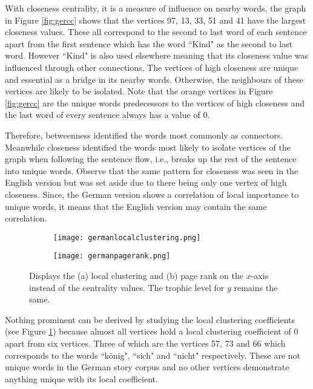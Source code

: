 With closeness centrality, it is a measure of influence on nearby words, the graph in Figure \ref{fig:gercc} shows that the vertices 97, 13, 33, 51 and 41 have the largest closeness values. These all correspond to the second to last word of each sentence apart from the first sentence which has the word ``Kind" as the second to last word. However ``Kind" is also used elsewhere meaning that its closeness value was influenced through other connections. The vertices of high closeness are unique and essential as a bridge in its nearby words. Otherwise, the neighbours of these vertices are likely to be isolated. Note that the orange vertices in Figure \ref{fig:gercc} are the unique words predecessors to the vertices of high closeness and the last word of every sentence always has a value of $0$.

Therefore, betweenness identified the words most commonly as connectors. Meanwhile closeness identified the words most likely to isolate vertices of the graph when following the sentence flow, i.e., breaks up the rest of the sentence into unique words. Observe that the same pattern for closeness was seen in the English version but was set aside due to there being only one vertex of high closeness. Since, the German version shows a correlation of local importance to unique words, it means that the English version may contain the same correlation.

\begin{figure}[!htb]
\centering
\begin{subfigure}{.45\textwidth}
	\hspace{-1cm} 
	\texttt{[image: germanlocalclustering.png]}
	\caption{}
	\label{fig:gerlc}
\end{subfigure}
\hfill
\begin{subfigure}{.45\textwidth}
	\hspace{-1cm} 
	\texttt{[image: germanpagerank.png]}
	\caption{}
	\label{fig:gerpr}
\end{subfigure}
\caption{Displays the (a) local clustering and (b) page rank on the $x$-axis instead of the centrality values. The trophic level for $y$ remains the same.}
\label{fig:gerother}
\end{figure}

Nothing prominent can be derived by studying the local clustering coefficients (see Figure \ref{fig:gerlc}) because almost all vertices hold a local clustering coefficient of 0 apart from six vertices. Three of which are the vertices 57, 73 and 66 which corresponds to the words ``könig", ``sich" and ``nicht" respectively. These are not unique words in the German story corpus and no other vertices demonstrate anything unique with its local coefficient. 

